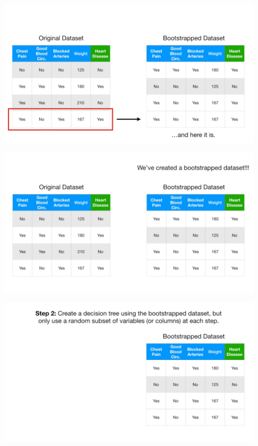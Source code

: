 \documentclass[
  ignorenonframetext,
]{beamer}
\begin{document}
\begin{frame}{}
\protect\hypertarget{section-20}{}
\includegraphics{images/r21.png}
\end{frame}

\begin{frame}{}
\protect\hypertarget{section-21}{}
\includegraphics{images/r22.png}
\end{frame}

\begin{frame}{}
\protect\hypertarget{section-22}{}
\includegraphics{images/r23.png}
\end{frame}
\end{document}
